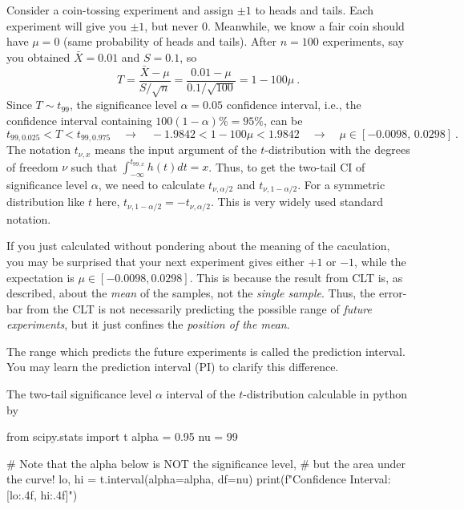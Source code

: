 \begin{ex}
  Consider a coin-tossing experiment and assign $ \pm 1 $ to heads and tails. Each experiment will give you $ \pm 1 $, but never $ 0 $. Meanwhile, we know a fair coin should have $ \mu = 0 $ (same probability of heads and tails). After $ n = 100 $ experiments, say you obtained $ \bar{X} = 0.01 $ and $ S = 0.1 $, so
  \begin{equation*}
    T = \frac{\bar{X} - \mu}{S / \sqrt{{n}}}
      = \frac{0.01 - \mu}{0.1 / \sqrt{100}} 
      = 1 - 100 \mu ~.
  \end{equation*}
  Since $ T \sim t_{99} $, the significance level $ \alpha = 0.05 $ confidence interval, i.e., the confidence interval containing $ 100 (1 - \alpha) \% = 95 \% $, can be
  \begin{equation*}
    t_{99, 0.025} < T < t_{99, 0.975}
    \quad \rightarrow \quad
      - 1.9842 < 1 - 100 \mu < 1.9842
    \quad \rightarrow \quad
      \mu \in [-0.0098,\, 0.0298] ~.
  \end{equation*}
  The notation $ t_{\nu, x} $ means the input argument of the $ t $-distribution with the degrees of freedom $ \nu $ such that $ \int_{-\infty}^{t_{99, x}} h(t) dt = x $. Thus, to get the two-tail CI of significance level $ \alpha $, we need to calculate $ t_{\nu, \alpha / 2} $ and $ t_{\nu, 1 - \alpha / 2} $. For a symmetric distribution like $ t $ here, $ t_{\nu, 1 - \alpha / 2} = - t_{\nu, \alpha / 2} $. This is very widely used standard notation.
  
  If you just calculated without pondering about the meaning of the caculation, you may be surprised that your next experiment gives either $ +1 $ or $ -1 $, while the expectation is $ \mu \in [-0.0098, 0.0298] $. This is because the result from CLT is, as described, about the \textit{mean} of the samples, not the \textit{single sample}. Thus, the error-bar from the CLT is not necessarily predicting the possible range of \textit{future experiments}, but it just confines the \textit{position of the mean}.
\end{ex}
The range which predicts the future experiments is called the prediction interval. You may learn the prediction interval (PI) to clarify this difference.

The two-tail significance level $ \alpha $ interval of the $ t $-distribution calculable in python by
\begin{python}
from scipy.stats import t
alpha = 0.95
nu = 99

# Note that the alpha below is NOT the significance level, 
# but the area under the curve!
lo, hi = t.interval(alpha=alpha, df=nu)
print(f"Confidence Interval: [{lo:.4f}, {hi:.4f}]")
\end{python}


